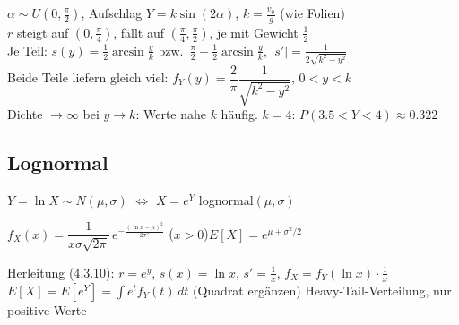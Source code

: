 \begin{bsp}
$\alpha\sim U(0,\frac\pi2)$, Aufschlag $Y=k\sin(2\alpha)$, $k=\frac{v_0}g$ (wie Folien)\\
$r$ steigt auf $(0,\frac\pi4)$, fällt auf $(\frac\pi4,\frac\pi2)$, je mit Gewicht $\frac12$\\
Je Teil: $s(y)=\frac12\arcsin\frac yk$ bzw.\ $\frac\pi2-\frac12\arcsin\frac yk$, $|s'|=\frac1{2\sqrt{k^2-y^2}}$\\
Beide Teile liefern gleich viel: $f_Y(y)=\dfrac{2}{\pi}\dfrac1{\sqrt{k^2-y^2}}$, $0<y<k$\\
Dichte $\to\infty$ bei $y\to k$: Werte nahe $k$ häufig. $k=4$: $P(3.5<Y<4)\approx0.322$
\end{bsp}

\subsection{Lognormal}
\begin{formel}
$Y=\ln X\sim N(\mu,\sigma)$ $\Leftrightarrow$ $X=e^Y$ lognormal$(\mu,\sigma)$
\end{formel}
\begin{formel}
$f_X(x)=\dfrac1{x\sigma\sqrt{2\pi}}\,e^{-\frac{(\ln x-\mu)^2}{2\sigma^2}}$ ($x>0$)\qquad $E[X]=e^{\mu+\sigma^2/2}$
\end{formel}
\begin{itemize}
\pfeil Herleitung (4.3.10): $r=e^y$, $s(x)=\ln x$, $s'=\frac1x$, $f_X=f_Y(\ln x)\cdot\frac1x$
\pfeil $E[X]=E[e^Y]=\int e^t f_Y(t)\,dt$ (Quadrat ergänzen)
\pfeil Heavy-Tail-Verteilung, nur positive Werte
\end{itemize}
